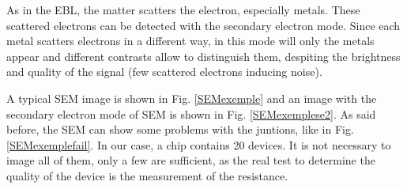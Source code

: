            As in the EBL, the matter scatters the electron, especially metals. These scattered electrons can be detected with the secondary electron mode. Since each metal scatters electrons in a different way, in this mode will only the metals appear and different contrasts allow to distinguish them, despiting the brightness and quality of the signal (few scattered electrons inducing noise).
            
            
            A typical SEM image is shown in Fig. \ref{SEMexemple} and an image with the secondary electron mode of SEM is shown in Fig. \ref{SEMexemplese2}. As said before, the SEM can show some problems with the juntions, like in Fig. \ref{SEMexemplefail}. In our case, a chip contains 20 devices. It is not necessary to image all of them, only a few are sufficient, as the real test to determine the quality of the device is the measurement of the resistance.
            
